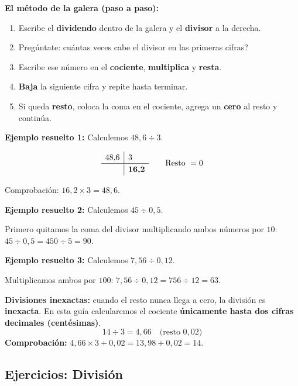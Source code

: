 \documentclass[12pt, letterpaper]{article}
\begin{document}
\begin{cuadropasos}
  \textbf{El método de la galera (paso a paso):}
  \begin{enumerate}
    \item Escribe el \textbf{dividendo} dentro de la galera y el \textbf{divisor} a la derecha.
    \item Pregúntate: \textquestiondown cuántas veces cabe el divisor en las primeras cifras?
    \item Escribe ese número en el \textbf{cociente}, \textbf{multiplica} y \textbf{resta}.
    \item \textbf{Baja} la siguiente cifra y repite hasta terminar.
    \item Si queda \textbf{resto}, coloca la coma en el cociente, agrega un \textbf{cero} al resto y continúa.
  \end{enumerate}
\end{cuadropasos}

\noindent\textbf{Ejemplo resuelto 1:} Calculemos $48{,}6 \div 3$.

\[
  \renewcommand{\arraystretch}{1.2}
  \begin{array}{r|l}
    48{,}6 & 3                   \\ \hline
           & \boldsymbol{16{,}2}
  \end{array}
  \qquad \text{Resto } = 0
\]

\noindent Comprobación: $16{,}2 \times 3 = 48{,}6$. \checkmark

\noindent\textbf{Ejemplo resuelto 2:} Calculemos $45 \div 0{,}5$.

Primero quitamos la coma del divisor multiplicando ambos números por $10$: $45 \div 0{,}5 = 450 \div 5 = 90$.

\noindent\textbf{Ejemplo resuelto 3:} Calculemos $7{,}56 \div 0{,}12$.

Multiplicamos ambos por $100$: $7{,}56 \div 0{,}12 = 756 \div 12 = 63$.

\begin{cuadroadvertencia}
  \textbf{Divisiones inexactas:} cuando el resto nunca llega a cero, la división es \textbf{inexacta}. En esta guía calcularemos el cociente \textbf{únicamente hasta dos cifras decimales (centésimas)}.
  \[
    14 \div 3 = 4{,}66 \quad \text{(resto } 0{,}02\text{)}
  \]
  \textbf{Comprobación:} $4{,}66 \times 3 + 0{,}02 = 13{,}98 + 0{,}02 = 14$. \checkmark
\end{cuadroadvertencia}

\subsection{Ejercicios: División}
\end{document}
